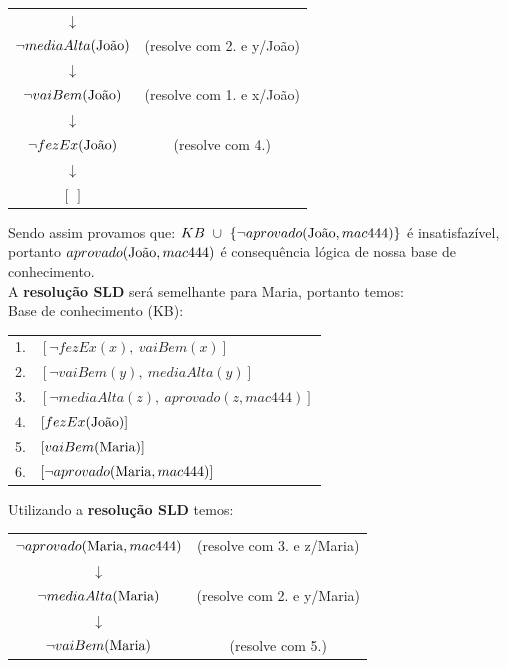 \documentclass[12pt]{article}
\begin{document}
\begin{itemize}
\begin{center}
\begin{tabular}{c c}
					$\downarrow$ & \\
					$\neg mediaAlta(\textnormal{João})$ & (resolve com 2. e y/João)\\
					$\downarrow$ & \\
					$\neg vaiBem(\textnormal{João})$ & (resolve com 1. e x/João)\\
					$\downarrow$ & \\
					$\neg fezEx(\textnormal{João})$ & (resolve com 4.)\\
					$\downarrow$ & \\
					$[ \ ]$ & \\
				\end{tabular}
			\end{center}
			Sendo assim provamos que: $KB \ \cup \  \{ \neg aprovado(\textnormal{João}, 
			mac444) \}$ é insatisfazível, portanto $aprovado(\textnormal{João}, mac444)$  
			é consequência lógica de nossa base de conhecimento.\\
			\newpage
			A \textbf{resolução SLD} será semelhante para Maria, portanto temos:\\
			Base de conhecimento (KB):\\
			\begin{center}
				\begin{tabular}{c l}
				1. & $[\neg fezEx(x), \ vaiBem(x)]$\\
				2. & $[\neg vaiBem(y), \ mediaAlta(y)]$\\
				3. & $[\neg mediaAlta(z), \ aprovado(z, mac444)] $\\
				4. & $[fezEx(\textnormal{João})]$\\
				5. & $[vaiBem(\textnormal{Maria})]$\\
				6. & $[\neg aprovado(\textnormal{Maria}, mac444)]$\\
				\end{tabular}
			\end{center}
			Utilizando a \textbf{resolução SLD} temos:\\
			\begin{center}
				\begin{tabular}{c c}
					$\neg aprovado(\textnormal{Maria}, mac444)$ & (resolve com 3. e z/Maria)\\
					$\downarrow$ & \\
					$\neg mediaAlta(\textnormal{Maria})$ & (resolve com 2. e y/Maria)\\
					$\downarrow$ & \\
					$\neg vaiBem(\textnormal{Maria})$ & (resolve com 5.)\\

\end{tabular}
\end{center}
\end{itemize}
\end{document}
